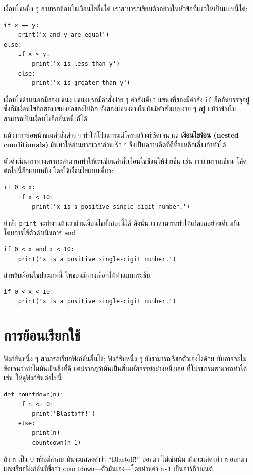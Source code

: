 เงื่อนไขหนึ่ง ๆ สามารถซ้อนในเงื่อนไขอื่นได้ เราสามารถเขียนตัวอย่างในหัวข้อที่แล้วให้เป็นแบบนี้ได้:

\begin{verbatim}
if x == y:
    print('x and y are equal')
else:
    if x < y:
        print('x is less than y')
    else:
        print('x is greater than y')
\end{verbatim}
%
เงื่อนไขด้านนอกมีสองแขนง แขนงแรกมีคำสั่งง่าย ๆ คำสั่งเดียว
แขนงที่สองมีคำสั่ง {\tt if} อีกอันบรรจุอยู่ ซึ่งก็มีเงื่อนไขอีกสองแขนงย่อยลงไปอีก 
ทั้งสองแขนงข้างในนั้นมีคำสั่งแบบง่าย ๆ อยู่ แม้ว่าข้างในสามารถเป็นเงื่อนไขอีกชั้นหนึ่งก็ได้

แม้ว่าการย่อหน้าของคำสั่งต่าง ๆ ทำให้โปรแกรมมีโครงสร้างที่ชัดเจน  แต่ {\bf เงื่อนไขซ้อน 
(nested conditionals)} มันทำให้อ่านยากเวลาอ่านเร็ว ๆ จึงเป็นความคิดที่ดีที่จะหลีกเลี่ยงถ้าทำได้

ตัวดำเนินการทางตรรกะสามารถทำให้เราเขียนคำสั่งเงื่อนไขซ้อนให้ง่ายขึ้น เช่น เราสามารถเขียน
โค้ดต่อไปนี้อีกแบบหนึ่ง โดยใช้เงื่อนไขแบบเดี่ยว:

\begin{verbatim}
if 0 < x:
    if x < 10:
        print('x is a positive single-digit number.')
\end{verbatim}
%
คำสั่ง {\tt print} จะทำงานถ้าเราผ่านเงื่อนไขทั้งสองนี้ได้ ดังนั้น เราสามารถทำให้เกิดผลอย่างเดียวกัน 
โดยการใช้ตัวดำเนินการ {\tt and}:

\begin{verbatim}
if 0 < x and x < 10:
    print('x is a positive single-digit number.')
\end{verbatim}

สำหรับเงื่อนไขประเภทนี้ ไพธอนมีทางเลือกให้ทำแบบกระชับ:

\begin{verbatim}
if 0 < x < 10:
    print('x is a positive single-digit number.')
\end{verbatim}


\section{การย้อนเรียกใช้} %
\label{recursion}


ฟังก์ชันหนึ่ง ๆ สามารถเรียกฟังก์ชันอื่นได้; ฟังก์ชันหนึ่ง ๆ ยังสามารถเรียกตัวเองได้ด้วย
มันอาจจะไม่ชัดเจนว่าทำไมมันเป็นสิ่งที่ดี แต่ปรากฎว่ามันเป็นสิ่งมหัศจรรย์อย่างหนึ่งเลย
ที่โปรแกรมสามารถทำได้ เช่น ให้ดูฟังก์ชันต่อไปนี้:

\begin{verbatim}
def countdown(n):
    if n <= 0:
        print('Blastoff!')
    else:
        print(n)
        countdown(n-1)
\end{verbatim}
%
ถ้า {\tt n} เป็น 0 หรือมีค่าลบ มันจะแสดงคำว่า ``Blastoff!'' ออกมา
ไม่เช่นนั้น มันจะแสดงค่า {\tt n} ออกมาและเรียกฟังก์ชันที่ชื่อว่า {\tt countdown}---ตัวมันเอง---โดยผ่านค่า {\tt n-1} เป็นอาร์กิวเมนต์

